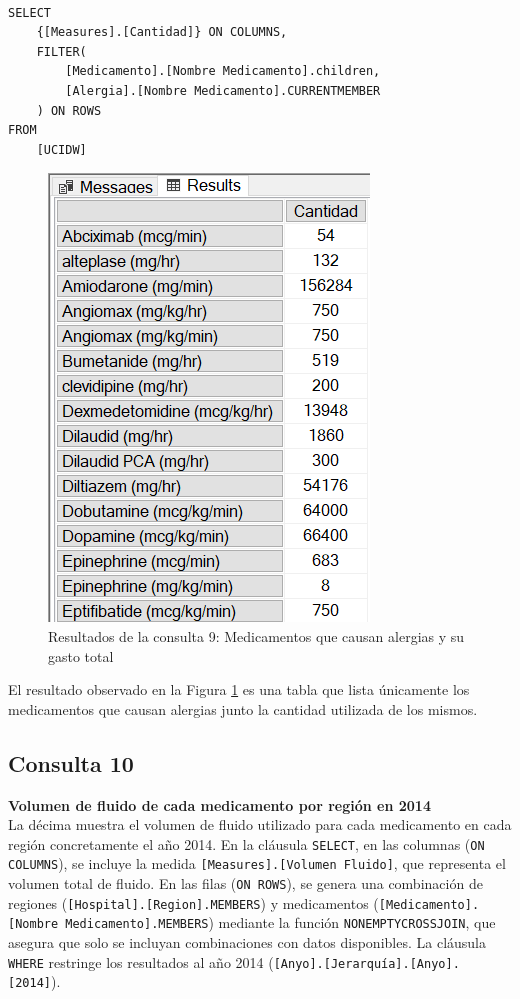 \documentclass{article}
\begin{document}
\begin{lstlisting}[style=ddlstyle, label=lst:consulta9,caption=Consulta 9: Medicamentos que causan alergias y su gasto total]
	
SELECT 
	{[Measures].[Cantidad]} ON COLUMNS, 
	FILTER(
		[Medicamento].[Nombre Medicamento].children, 
		[Alergia].[Nombre Medicamento].CURRENTMEMBER 
	) ON ROWS
FROM 
	[UCIDW]

\end{lstlisting}


\begin{figure}[H]
	\centering
	\includegraphics[width=0.3\linewidth]{images/consulta9.png}
	\caption{Resultados de la consulta 9: Medicamentos que causan alergias y su gasto total}
	\label{fig:consulta9}
\end{figure}

 El resultado observado en la Figura \ref{fig:consulta9} es una tabla que lista únicamente los medicamentos que causan alergias junto la cantidad utilizada de los mismos.
 
\subsection{Consulta 10}
\textbf{Volumen de fluido de cada medicamento por región en 2014}
\\

La décima muestra el volumen de fluido utilizado para cada medicamento en cada región concretamente el año 2014. En la cláusula \texttt{SELECT}, en las columnas (\texttt{ON COLUMNS}), se incluye la medida \texttt{[Measures].[Volumen Fluido]}, que representa el volumen total de fluido. En las filas (\texttt{ON ROWS}), se genera una combinación de regiones (\texttt{[Hospital].[Region].MEMBERS}) y medicamentos (\texttt{[Medicamento].[Nombre Medicamento].MEMBERS}) mediante la función \texttt{NONEMPTYCROSSJOIN}, que asegura que solo se incluyan combinaciones con datos disponibles. La cláusula \texttt{WHERE} restringe los resultados al año 2014 (\texttt{[Anyo].[Jerarquía].[Anyo].[2014]}).
\end{document}
